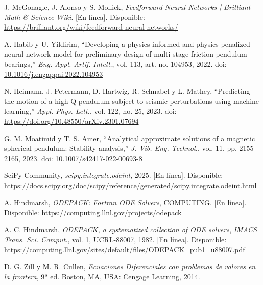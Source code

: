 \noindent [13] J. McGonagle, J. Alonso y S. Mollick, \textit{Feedforward Neural Networks | Brilliant Math \& Science Wiki}. [En línea]. Disponible: \url{https://brilliant.org/wiki/feedforward-neural-networks/}

\noindent [14] A. Habib y U. Yildirim, ``Developing a physics-informed and physics-penalized neural network model for preliminary design of multi-stage friction pendulum bearings,'' \textit{Eng. Appl. Artif. Intell.}, vol. 113, art. no. 104953, 2022. doi: \url{10.1016/j.engappai.2022.104953}

\noindent [15] N. Heimann, J. Petermann, D. Hartwig, R. Schnabel y L. Mathey, ``Predicting the motion of a high-Q pendulum subject to seismic perturbations using machine learning,'' \textit{Appl. Phys. Lett.}, vol. 122, no. 25, 2023. doi: \url{https://doi.org/10.48550/arXiv.2301.07694}

\noindent [16] G. M. Moatimid y T. S. Amer, ``Analytical approximate solutions of a magnetic spherical pendulum: Stability analysis,'' \textit{J. Vib. Eng. Technol.}, vol. 11, pp. 2155--2165, 2023. doi: \url{10.1007/s42417-022-00693-8}

\noindent [17] SciPy Community, \textit{scipy.integrate.odeint}, 2025. [En línea]. Disponible: \url{https://docs.scipy.org/doc/scipy/reference/generated/scipy.integrate.odeint.html}

\noindent [18] A. Hindmarsh, \textit{ODEPACK: Fortran ODE Solvers}, COMPUTING. [En línea]. Disponible: \url{https://computing.llnl.gov/projects/odepack}

\noindent [19] A. C. Hindmarsh, \textit{ODEPACK, a systematized collection of ODE solvers}, \textit{IMACS Trans. Sci. Comput.}, vol. 1, UCRL-88007, 1982. [En línea]. Disponible: \url{https://computing.llnl.gov/sites/default/files/ODEPACK_pub1_u88007.pdf}

\noindent [20] D. G. Zill y M. R. Cullen, \textit{Ecuaciones Diferenciales con problemas de valores en la frontera}, 9ª ed. Boston, MA, USA: Cengage Learning, 2014.
